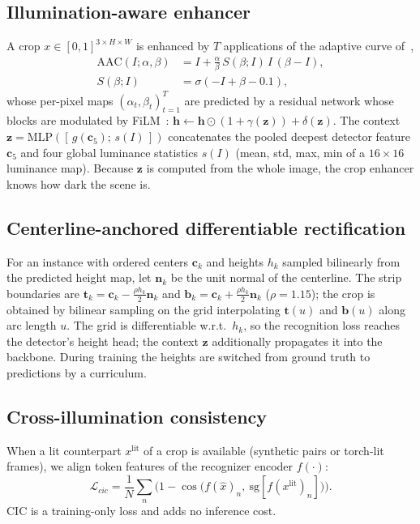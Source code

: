 \documentclass[journal]{IEEEtran}
\begin{document}
\subsection{Illumination-aware enhancer}
A crop $x\in[0,1]^{3\times H\times W}$ is enhanced by $T$ applications of the adaptive curve of~\cite{fu2026reading,wen2023srdace},
\begin{equation}
\begin{split}
\mathrm{AAC}(I;\alpha,\beta)&=I+\tfrac{\alpha}{\beta}\,S(\beta;I)\,I\,(\beta-I),\\
S(\beta;I)&=\sigma(-I+\beta-0.1),
\end{split}
\end{equation}
whose per-pixel maps $(\alpha_t,\beta_t)_{t=1}^{T}$ are predicted by a residual network whose blocks are modulated by FiLM~\cite{perez2018film}: $\mathbf{h}\leftarrow \mathbf{h}\odot(1+\gamma(\mathbf{z}))+\delta(\mathbf{z})$. The context $\mathbf{z}=\mathrm{MLP}([\,g(\mathbf{c}_5);\,s(I)\,])$ concatenates the pooled deepest detector feature $\mathbf{c}_5$ and four global luminance statistics $s(I)$ (mean, std, max, min of a $16{\times}16$ luminance map). Because $\mathbf{z}$ is computed from the whole image, the crop enhancer knows how dark the scene is.

\subsection{Centerline-anchored differentiable rectification}
For an instance with ordered centers $\mathbf{c}_k$ and heights $h_k$ sampled bilinearly from the predicted height map, let $\mathbf{n}_k$ be the unit normal of the centerline. The strip boundaries are $\mathbf{t}_k=\mathbf{c}_k-\tfrac{\rho h_k}{2}\mathbf{n}_k$ and $\mathbf{b}_k=\mathbf{c}_k+\tfrac{\rho h_k}{2}\mathbf{n}_k$ ($\rho{=}1.15$); the crop is obtained by bilinear sampling on the grid interpolating $\mathbf{t}(u)$ and $\mathbf{b}(u)$ along arc length $u$. The grid is differentiable w.r.t.\ $h_k$, so the recognition loss reaches the detector's height head; the context $\mathbf{z}$ additionally propagates it into the backbone. During training the heights are switched from ground truth to predictions by a curriculum.

\subsection{Cross-illumination consistency}
When a lit counterpart $x^{\mathrm{lit}}$ of a crop is available (synthetic pairs or torch-lit frames), we align token features of the recognizer encoder $f(\cdot)$:
\begin{equation}
\mathcal{L}_{cic}=\frac{1}{N}\sum_{n}\Big(1-\cos\big(f(\hat{x})_n,\ \mathrm{sg}[f(x^{\mathrm{lit}})_n]\big)\Big).
\end{equation}
CIC is a training-only loss and adds no inference cost.
\end{document}
